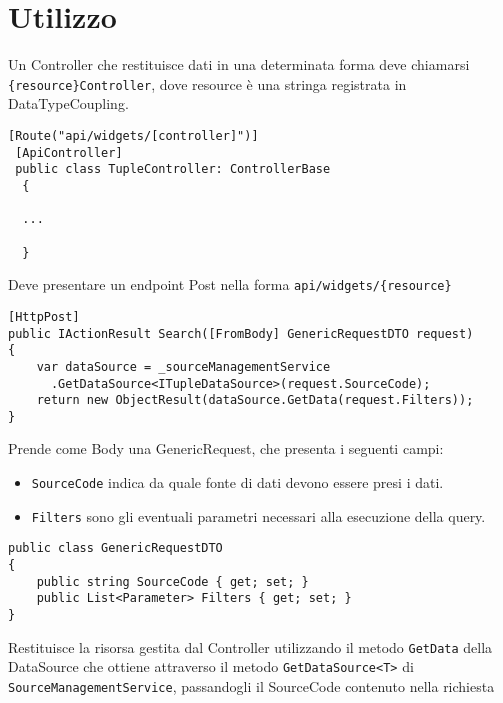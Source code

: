 \section{Utilizzo}
Un Controller che restituisce dati in una determinata forma deve chiamarsi \verb|{resource}Controller|, dove resource è una stringa registrata in DataTypeCoupling.
\begin{lstlisting}[caption={TupleController.cs}, style=sharpCode]
 [Route("api/widgets/[controller]")]
 [ApiController]
 public class TupleController: ControllerBase
  {
  
  ...
  
  }
\end{lstlisting}
Deve presentare un endpoint Post nella forma \verb|api/widgets/{resource}|
\begin{lstlisting}[caption={TupleController.cs}, style=sharpCode]
[HttpPost]
public IActionResult Search([FromBody] GenericRequestDTO request)
{
    var dataSource = _sourceManagementService
      .GetDataSource<ITupleDataSource>(request.SourceCode);
    return new ObjectResult(dataSource.GetData(request.Filters));
}
\end{lstlisting}
Prende come Body una GenericRequest, che presenta i seguenti campi:
\begin{itemize}
\item \verb|SourceCode| indica da quale fonte di dati devono essere presi i dati.
\item \verb|Filters| sono gli eventuali parametri necessari alla esecuzione della query.
\end{itemize}
\begin{lstlisting}[caption={GenericRequestDTO.cs}, style=sharpCode]
public class GenericRequestDTO
{
    public string SourceCode { get; set; }
    public List<Parameter> Filters { get; set; }
}
\end{lstlisting}
Restituisce la risorsa gestita dal Controller utilizzando il metodo \verb|GetData| della DataSource che ottiene attraverso il metodo \verb|GetDataSource<T>| di \verb|SourceManagementService|, passandogli il SourceCode contenuto nella richiesta